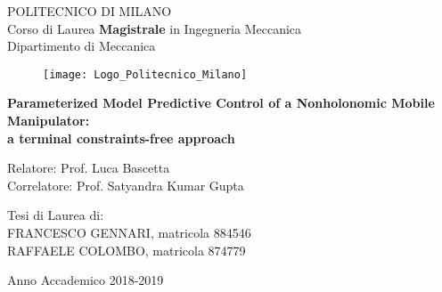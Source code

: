 \thispagestyle{empty}
\vspace*{-2cm} \bfseries{
\begin{center}
  \large
  POLITECNICO DI MILANO\\
  \normalsize
  Corso di Laurea \textbf{Magistrale} in Ingegneria Meccanica\\
  Dipartimento di Meccanica\\
  \begin{figure}[htbp]
    \begin{center}
      \texttt{[image: Logo\_Politecnico\_Milano]}
	 \centering
    \end{center}
  \end{figure}
  \vspace*{0.3cm} \LARGE


  \textbf{Parameterized Model Predictive Control of a Nonholonomic Mobile Manipulator: \\ a terminal constraints-free approach}\\


\end{center}
\vspace*{1.5cm} \large
\begin{flushleft}


  Relatore: Prof. Luca Bascetta \\
  Correlatore: Prof. Satyandra Kumar Gupta\\
 

\end{flushleft}
\vspace*{1.5cm}
\begin{flushright}


  Tesi di Laurea di:\\ FRANCESCO GENNARI, matricola 884546 \\
  RAFFAELE COLOMBO, matricola 874779 \\

\end{flushright}
\vspace*{1.5cm}
\begin{center}



  Anno Accademico 2018-2019
\end{center} \clearpage
}
